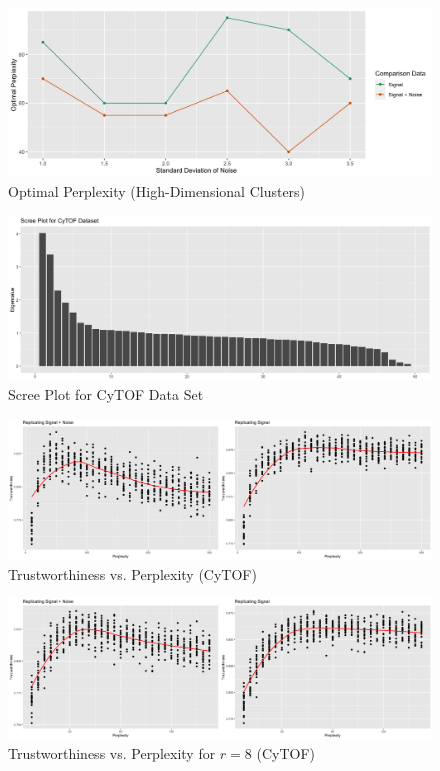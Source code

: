 \documentclass{article}
\begin{document}
\renewcommand{\thefigure}{8}
\begin{figure}[b]
\centering
\includegraphics[scale=0.38]{optimal_perp_high_dim}
\caption{Optimal Perplexity (High-Dimensional Clusters)}
\end{figure}

\renewcommand{\thefigure}{9}
\begin{figure}[t]
\includegraphics[scale=0.3]{CyTOF_scree}
\centering
\caption{Scree Plot for CyTOF Data Set}
\end{figure}

\renewcommand{\thefigure}{10}
\begin{figure}[b]
\includegraphics[scale=0.22]{trust_plot_CyTOF}
\centering
\caption{Trustworthiness vs. Perplexity (CyTOF)}
\end{figure}

\renewcommand{\thefigure}{11}
\begin{figure}[t]
\includegraphics[scale=0.22]{trust_plot_CyTOF2}
\centering
\caption{Trustworthiness vs. Perplexity for $r = 8$ (CyTOF)}
\end{figure}
\end{document}
